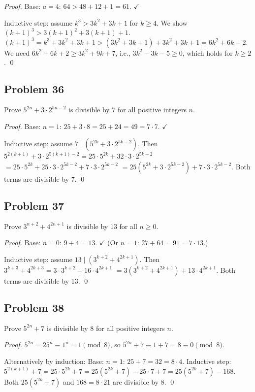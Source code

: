 \textit{Proof.} Base: $a=4$: $64 > 48 + 12 + 1 = 61$. $\checkmark$

Inductive step: assume $k^3 > 3k^2 + 3k + 1$ for $k \ge 4$. We show $(k+1)^3 > 3(k+1)^2 + 3(k+1) + 1$.
$(k+1)^3 = k^3 + 3k^2 + 3k + 1 > (3k^2 + 3k + 1) + 3k^2 + 3k + 1 = 6k^2 + 6k + 2$.
We need $6k^2 + 6k + 2 \ge 3k^2 + 9k + 7$, i.e., $3k^2 - 3k - 5 \ge 0$, which holds for $k \ge 2$. \qed

\subsection*{Problem 36}
Prove $5^{2n} + 3 \cdot 2^{5n-2}$ is divisible by 7 for all positive integers $n$.

\textit{Proof.} Base: $n=1$: $25 + 3 \cdot 8 = 25 + 24 = 49 = 7 \cdot 7$. $\checkmark$

Inductive step: assume $7 \mid (5^{2k} + 3 \cdot 2^{5k-2})$. Then
$5^{2(k+1)} + 3 \cdot 2^{5(k+1)-2} = 25 \cdot 5^{2k} + 32 \cdot 3 \cdot 2^{5k-2}$
$= 25 \cdot 5^{2k} + 25 \cdot 3 \cdot 2^{5k-2} + 7 \cdot 3 \cdot 2^{5k-2}$
$= 25(5^{2k} + 3 \cdot 2^{5k-2}) + 7 \cdot 3 \cdot 2^{5k-2}$.
Both terms are divisible by 7. \qed

\subsection*{Problem 37}
Prove $3^{n+2} + 4^{2n+1}$ is divisible by 13 for all $n \ge 0$.

\textit{Proof.} Base: $n=0$: $9 + 4 = 13$. $\checkmark$ (Or $n=1$: $27 + 64 = 91 = 7 \cdot 13$.)

Inductive step: assume $13 \mid (3^{k+2} + 4^{2k+1})$. Then
$3^{k+3} + 4^{2k+3} = 3 \cdot 3^{k+2} + 16 \cdot 4^{2k+1}$
$= 3(3^{k+2} + 4^{2k+1}) + 13 \cdot 4^{2k+1}$.
Both terms are divisible by 13. \qed

\subsection*{Problem 38}
Prove $5^{2n} + 7$ is divisible by 8 for all positive integers $n$.

\textit{Proof.} $5^{2n} = 25^n \equiv 1^n = 1 \pmod{8}$, so $5^{2n} + 7 \equiv 1 + 7 = 8 \equiv 0 \pmod{8}$.

Alternatively by induction: Base: $n=1$: $25 + 7 = 32 = 8 \cdot 4$.
Inductive step: $5^{2(k+1)} + 7 = 25 \cdot 5^{2k} + 7 = 25(5^{2k}+7) - 25 \cdot 7 + 7 = 25(5^{2k}+7) - 168$.
Both $25(5^{2k}+7)$ and $168 = 8 \cdot 21$ are divisible by 8. \qed


